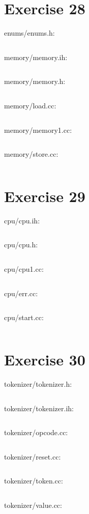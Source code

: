 \documentclass{article}[10pt]
\begin{document}
\section*{Exercise 28}
enums/enums.h:
\inputminted[linenos=true, tabsize=4, frame=lines]{text}{../virtualcpu/enums/enums.h}

memory/memory.ih:
\inputminted[linenos=true, tabsize=4, frame=lines]{text}{../virtualcpu/memory/memory.ih}

memory/memory.h:
\inputminted[linenos=true, tabsize=4, frame=lines]{text}{../virtualcpu/memory/memory.h}

memory/load.cc:
\inputminted[linenos=true, tabsize=4, frame=lines]{text}{../virtualcpu/memory/load.cc}

memory/memory1.cc:
\inputminted[linenos=true, tabsize=4, frame=lines]{text}{../virtualcpu/memory/memory1.cc}

memory/store.cc:
\inputminted[linenos=true, tabsize=4, frame=lines]{text}{../virtualcpu/memory/store.cc}

\section*{Exercise 29}
cpu/cpu.ih:
\inputminted[linenos=true, tabsize=4, frame=lines]{text}{../virtualcpu/cpu/cpu.ih}
cpu/cpu.h:
\inputminted[linenos=true, tabsize=4, frame=lines]{text}{../virtualcpu/cpu/cpu.h}
cpu/cpu1.cc:
\inputminted[linenos=true, tabsize=4, frame=lines]{text}{../virtualcpu/cpu/cpu1.cc}
cpu/err.cc:
\inputminted[linenos=true, tabsize=4, frame=lines]{text}{../virtualcpu/cpu/err.cc}
cpu/start.cc:
\inputminted[linenos=true, tabsize=4, frame=lines]{text}{../virtualcpu/cpu/start.cc}
\section*{Exercise 30} 
tokenizer/tokenizer.h:
\inputminted[linenos=true, tabsize=4, frame=lines]{text}{../virtualcpu/tokenizer/tokenizer.h}
tokenizer/tokenizer.ih:
\inputminted[linenos=true, tabsize=4, frame=lines]{text}{../virtualcpu/tokenizer/tokenizer.ih}
tokenizer/opcode.cc:
\inputminted[linenos=true, tabsize=4, frame=lines]{text}{../virtualcpu/tokenizer/opcode.cc}
tokenizer/reset.cc:
\inputminted[linenos=true, tabsize=4, frame=lines]{text}{../virtualcpu/tokenizer/reset.cc}
tokenizer/token.cc:
\inputminted[linenos=true, tabsize=4, frame=lines]{text}{../virtualcpu/tokenizer/token.cc}
tokenizer/value.cc:
\inputminted[linenos=true, tabsize=4, frame=lines]{text}{../virtualcpu/tokenizer/value.cc}
\end{document}
